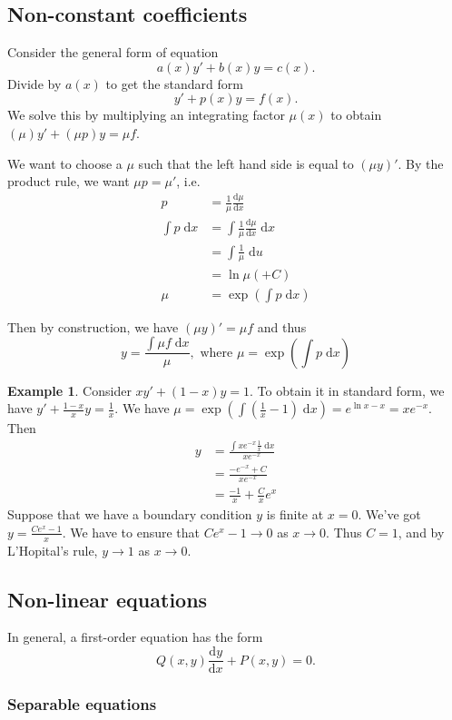 \documentclass[a4paper]{article}
\theoremstyle{definition}
\newtheorem*{eg}{Example}
\renewcommand{\d}{\mathrm{d}}
\begin{document}
\subsection{Non-constant coefficients}
Consider the general form of equation
\[
a(x)y' + b(x)y = c(x).
\]
Divide by $a(x)$ to get the standard form
\[
y' + p(x) y  = f(x).
\]
We solve this by multiplying an integrating factor $\mu (x)$ to obtain $(\mu)y' + (\mu p)y = \mu f$.

We want to choose a $\mu$ such that the left hand side is equal to $(\mu y)'$. By the product rule, we want $\mu p = \mu'$, i.e.
\begin{align*}
  p &= \frac{1}{\mu}\frac{\d\mu }{\d x}\\
  \int p\; \d x &= \int \frac{1}{\mu}\frac{\d \mu}{\d x} \; \d x\\
  &= \int \frac{1}{\mu}\; \d u\\
  &= \ln \mu (+ C)\\
  \mu &= \exp\left(\int p\; \d x\right)
\end{align*}

Then by construction, we have $(\mu y)' = \mu f$ and thus
\[
y = \frac{\int \mu f\;\d x}{\mu},\text{ where } \mu = \exp\left(\int p\; \d x\right)
\]
\begin{eg}
  Consider $xy' + (1 - x)y = 1$. To obtain it in standard form, we have $y' + \frac{1 - x}{x} y = \frac{1}{x}$.
We have $\mu = \exp\left(\int (\frac{1}{x} - 1)\; \d x\right) = e^{\ln x - x} = xe^{-x}$. Then 
\begin{align*}
  y &= \frac{\int xe^{-x}\frac{1}{x}\;\d x}{xe^{-x}}\\
  &= \frac{-e^{-x} + C}{xe^{-x}}\\
  &= \frac{-1}{x} + \frac{C}{x}e^x
\end{align*}
Suppose that we have a boundary condition $y$ is finite at $x = 0$. We've got $y = \frac{Ce^x - 1}{x}$. We have to ensure that $Ce^x - 1\to 0$ as $x\to 0$. Thus $C = 1$, and by L'Hopital's rule, $y\to 1$ as $x\to 0$.
\end{eg}

\subsection{Non-linear equations}
In general, a first-order equation has the form
\[
Q(x, y)\frac{\d y}{\d x} + P(x, y) = 0.
\]
\subsubsection{Separable equations}
\end{document}
